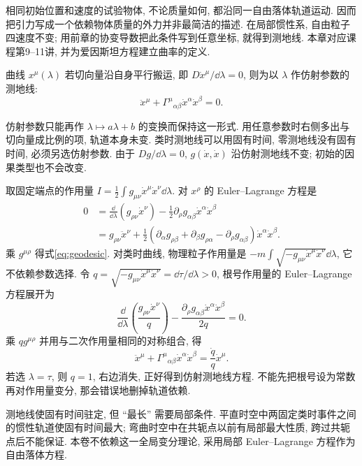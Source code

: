 \label{ch:curvature}
相同初始位置和速度的试验物体, 不论质量如何, 都沿同一自由落体轨道运动. 因而把引力写成一个依赖物体质量的外力并非最简洁的描述. 在局部惯性系, 自由粒子四速度不变; 用前章的协变导数把此条件写到任意坐标, 就得到测地线. 本章对应课程第9--11讲, 并为爱因斯坦方程建立曲率的定义.

\begin{definition}
曲线 $x^\mu(\lambda)$ 若切向量沿自身平行搬运, 即 $D\dot x^\mu/\dd\lambda=0$, 则为以 $\lambda$ 作仿射参数的测地线:
\begin{equation}\label{eq:geodesic}
\ddot x^\mu+\Gamma^\mu{}_{\alpha\beta}\dot x^\alpha\dot x^\beta=0.
\end{equation}
\end{definition}
仿射参数只能再作 $\lambda\mapsto a\lambda+b$ 的变换而保持这一形式. 用任意参数时右侧多出与切向量成比例的项, 轨道本身未变. 类时测地线可以用固有时间, 零测地线没有固有时间, 必须另选仿射参数. 由于 $Dg/\dd\lambda=0$, $g(\dot x,\dot x)$ 沿仿射测地线不变; 初始的因果类型也不会改变.

取固定端点的作用量 $I=\frac12\int g_{\mu\nu}\dot x^\mu\dot x^\nu\dd\lambda$. 对 $x^\rho$ 的 Euler--Lagrange 方程是
\begin{align*}
0&=\frac{\dd}{\dd\lambda}(g_{\rho\nu}\dot x^\nu)
-\frac12\partial_\rho g_{\alpha\beta}\dot x^\alpha\dot x^\beta\\
&=g_{\rho\nu}\ddot x^\nu+
\frac12(\partial_\alpha g_{\rho\beta}+\partial_\beta g_{\rho\alpha}-\partial_\rho g_{\alpha\beta})\dot x^\alpha\dot x^\beta.
\end{align*}
乘 $g^{\mu\rho}$ 得式\eqref{eq:geodesic}. 对类时曲线, 物理粒子作用量是 $-m\int\sqrt{-g_{\mu\nu}\dot x^\mu\dot x^\nu}\dd\lambda$, 它不依赖参数选择. 令 $q=\sqrt{-g_{\mu\nu}\dot x^\mu\dot x^\nu}=\dd\tau/\dd\lambda>0$, 根号作用量的 Euler--Lagrange 方程展开为
\[
\frac{\dd}{\dd\lambda}\left(\frac{g_{\rho\nu}\dot x^\nu}{q}\right)
-\frac{\partial_\rho g_{\alpha\beta}\dot x^\alpha\dot x^\beta}{2q}=0.
\]
乘 $qg^{\mu\rho}$ 并用与二次作用量相同的对称组合, 得
\[
\ddot x^\mu+\Gamma^\mu{}_{\alpha\beta}\dot x^\alpha\dot x^\beta
=\frac{\dot q}{q}\dot x^\mu.
\]
若选 $\lambda=\tau$, 则 $q=1$, 右边消失, 正好得到仿射测地线方程. 不能先把根号设为常数再对作用量变分, 那会错误地删掉轨道依赖.

测地线使固有时间驻定, 但 ``最长'' 需要局部条件. 平直时空中两固定类时事件之间的惯性轨道使固有时间最大; 弯曲时空中在共轭点以前有局部最大性质, 跨过共轭点后不能保证. 本卷不依赖这一全局变分理论, 采用局部 Euler--Lagrange 方程作为自由落体方程.

